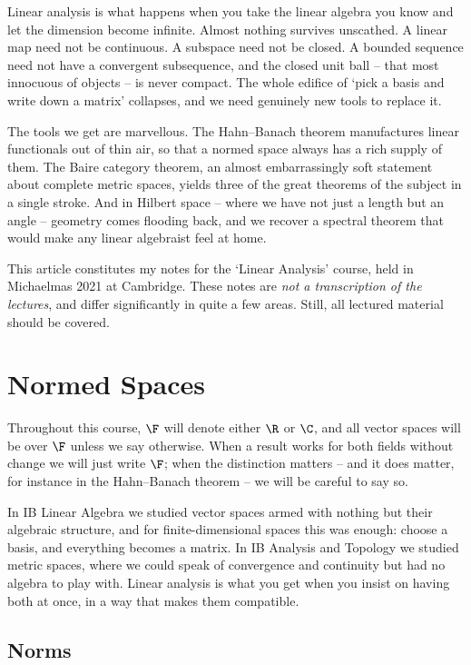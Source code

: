



Linear analysis is what happens when you take the linear algebra you know and let the dimension become infinite. Almost nothing survives unscathed. A linear map need not be continuous. A subspace need not be closed. A bounded sequence need not have a convergent subsequence, and the closed unit ball -- that most innocuous of objects -- is never compact. The whole edifice of `pick a basis and write down a matrix' collapses, and we need genuinely new tools to replace it.

The tools we get are marvellous. The Hahn--Banach theorem manufactures linear functionals out of thin air, so that a normed space always has a rich supply of them. The Baire category theorem, an almost embarrassingly soft statement about complete metric spaces, yields three of the great theorems of the subject in a single stroke. And in Hilbert space -- where we have not just a length but an angle -- geometry comes flooding back, and we recover a spectral theorem that would make any linear algebraist feel at home.

This article constitutes my notes for the `Linear Analysis' course, held in Michaelmas 2021 at Cambridge. These notes are \emph{not a transcription of the lectures}, and differ significantly in quite a few areas. Still, all lectured material should be covered.



\section{Normed Spaces}

Throughout this course, $\F$ will denote either $\R$ or $\C$, and all vector spaces will be over $\F$ unless we say otherwise. When a result works for both fields without change we will just write $\F$; when the distinction matters -- and it does matter, for instance in the Hahn--Banach theorem -- we will be careful to say so.

In IB Linear Algebra we studied vector spaces armed with nothing but their algebraic structure, and for finite-dimensional spaces this was enough: choose a basis, and everything becomes a matrix. In IB Analysis and Topology we studied metric spaces, where we could speak of convergence and continuity but had no algebra to play with. Linear analysis is what you get when you insist on having both at once, in a way that makes them compatible.

\subsection{Norms}

